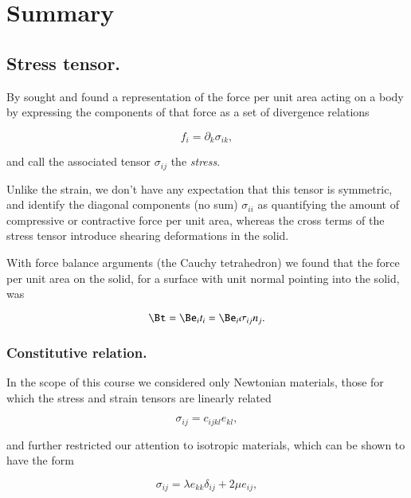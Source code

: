 \section{Summary}
\subsection{Stress tensor.}

By sought and found a representation of the force per unit area acting on a body by expressing the components of that force as a set of divergence relations

\begin{equation}\label{eqn:continuumElasticityReview:250}
f_i = \partial_k \sigma_{i k},
\end{equation}

and call the associated tensor $\sigma_{ij}$ the \textit{stress}.

Unlike the strain, we don't have any expectation that this tensor is symmetric, and identify the diagonal components (no sum) $\sigma_{i i}$ as quantifying the amount of compressive or contractive force per unit area, whereas the cross terms of the stress tensor introduce shearing deformations in the solid.

With force balance arguments (the Cauchy tetrahedron) we found that the force per unit area on the solid, for a surface with unit normal pointing into the solid, was

\begin{equation}\label{eqn:continuumElasticityReview:270}
\Bt = \Be_i t_i = \Be_i \sigma_{ij} n_j.
\end{equation}

\subsubsection{Constitutive relation.}

In the scope of this course we considered only Newtonian materials, those for which the stress and strain tensors are linearly related

\begin{equation}\label{eqn:continuumElasticityReview:290}
\sigma_{ij} = c_{ijkl} e_{kl},
\end{equation}

and further restricted our attention to isotropic materials, which can be shown to have the form

\begin{equation}\label{eqn:continuumElasticityReview:310}
\sigma_{ij} = \lambda e_{kk} \delta_{ij} + 2 \mu e_{ij},
\end{equation}

